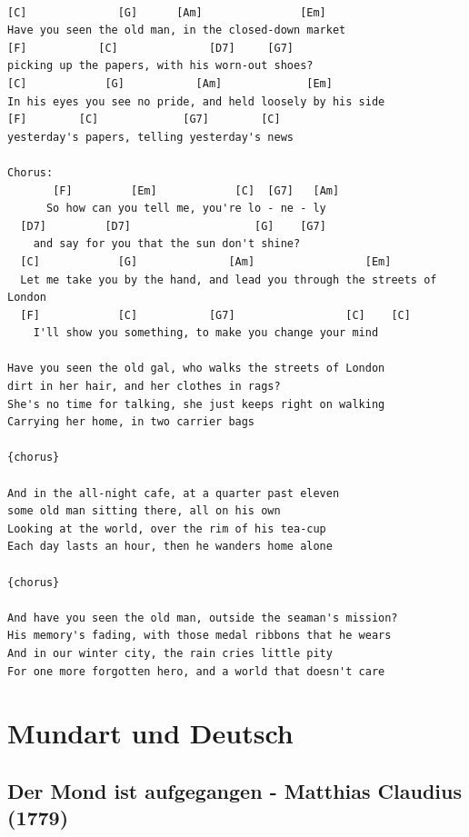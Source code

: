 \documentclass[
]{book}
\let\stdsection\section
\renewcommand\section{\clearpage\stdsection}
\begin{document}
\begin{verbatim}

[C]              [G]      [Am]               [Em]
Have you seen the old man, in the closed-down market
[F]           [C]              [D7]     [G7]
picking up the papers, with his worn-out shoes?
[C]            [G]           [Am]             [Em]
In his eyes you see no pride, and held loosely by his side
[F]        [C]             [G7]        [C]
yesterday's papers, telling yesterday's news

Chorus:
       [F]         [Em]            [C]  [G7]   [Am]
      So how can you tell me, you're lo - ne - ly
  [D7]         [D7]                   [G]    [G7]
    and say for you that the sun don't shine?
  [C]            [G]              [Am]                 [Em]
  Let me take you by the hand, and lead you through the streets of London
  [F]            [C]           [G7]                 [C]    [C]
    I'll show you something, to make you change your mind

Have you seen the old gal, who walks the streets of London
dirt in her hair, and her clothes in rags?
She's no time for talking, she just keeps right on walking
Carrying her home, in two carrier bags

{chorus}

And in the all-night cafe, at a quarter past eleven
some old man sitting there, all on his own
Looking at the world, over the rim of his tea-cup
Each day lasts an hour, then he wanders home alone

{chorus}

And have you seen the old man, outside the seaman's mission?
His memory's fading, with those medal ribbons that he wears
And in our winter city, the rain cries little pity
For one more forgotten hero, and a world that doesn't care

\end{verbatim}

\hypertarget{mundart-und-deutsch}{%
\chapter{Mundart und Deutsch}\label{mundart-und-deutsch}}

\hypertarget{der-mond-ist-aufgegangen---matthias-claudius-1779}{%
\section{Der Mond ist aufgegangen - Matthias Claudius (1779)}\label{der-mond-ist-aufgegangen---matthias-claudius-1779}}
\end{document}
